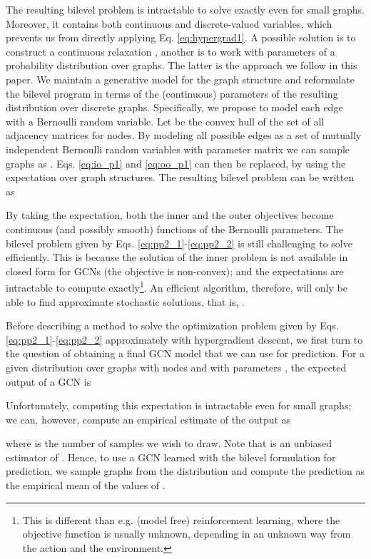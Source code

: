 \documentclass{article}
\begin{document}
	The resulting bilevel problem is intractable to solve exactly even for small graphs. Moreover, it contains both continuous and discrete-valued variables,
which prevents us from directly applying Eq. \eqref{eq:hypergrad1}. A possible solution is to construct a continuous relaxation \citep[see e.g.][]{frecon2019bilevel}, another is to work with parameters of a probability distribution over graphs. The latter is the approach we follow in this paper.
We maintain a generative model for the graph structure and reformulate the bilevel program in terms of the (continuous) parameters of the resulting distribution over discrete graphs. 
	Specifically, we propose to model each edge with a Bernoulli random variable.
Let  be the convex hull of the set of all adjacency matrices for  nodes. 
By modeling all possible edges as a set of mutually independent Bernoulli random variables with parameter matrix  we can sample graphs as .
	Eqs. \eqref{eq:io_p1} and \eqref{eq:oo_p1} can then be replaced, by using the expectation over graph structures. The resulting bilevel problem can be written as 
	
By taking the expectation, both the inner and the outer objectives become continuous (and possibly smooth) functions of the Bernoulli parameters. The bilevel problem given by Eqs. \eqref{eq:pp2_1}-\eqref{eq:pp2_2} is still challenging to solve efficiently. This is because the solution of the inner problem is not available in closed form for GCNs (the objective is non-convex); and the expectations are intractable to compute exactly\footnote{This is different than e.g. (model free) reinforcement learning, where the objective function is usually unknown, depending in an unknown way from the action and the environment.}.
	An efficient algorithm, therefore, will only be able to find approximate stochastic solutions, that is,  . 


    Before describing a method to solve the optimization problem given by Eqs. \eqref{eq:pp2_1}-\eqref{eq:pp2_2} approximately with hypergradient descent, we first turn to the question of obtaining a final GCN model that we can use for prediction.
For a given distribution  over graphs with  nodes and with parameters , the expected output of a GCN is 
	
Unfortunately, computing this expectation is intractable even for small graphs; we can, however, compute an empirical estimate of the output as

	where  is the number of samples we wish to draw. Note that  is an unbiased estimator of . Hence, to use a GCN  learned with the bilevel formulation for prediction, we sample  graphs from the distribution  and compute the prediction as the empirical mean of the values of . 
	
\end{document}
